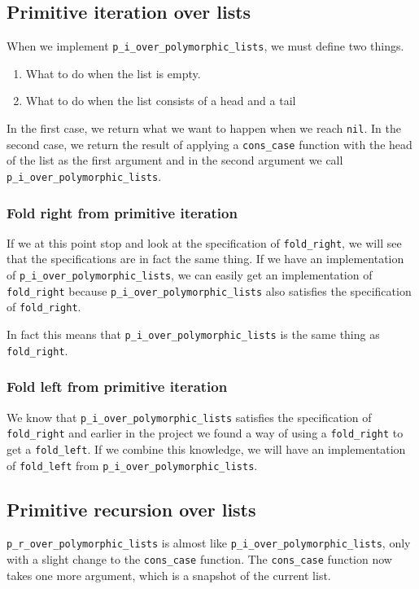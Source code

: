 \documentclass[a4paper]{article}
\begin{document}
\subsection{Primitive iteration over lists}
When we implement \texttt{p\_i\_over\_polymorphic\_lists}, we must define two
things.
\begin{enumerate}
  \item What to do when the list is empty.
  \item What to do when the list consists of a head and a tail
\end{enumerate}

In the first case, we return what we want to happen when we reach \texttt{nil}.
In the second case, we return the result of applying a \texttt{cons\_case}
function with the head of the list as the first argument and in the second
argument we call \texttt{p\_i\_over\_polymorphic\_lists}.

\subsubsection{Fold right from primitive iteration}
If we at this point stop and look at the specification of \texttt{fold\_right},
we will see that the specifications are in fact the same thing. If we have an
implementation of \texttt{p\_i\_over\_polymorphic\_lists}, we can easily get an
implementation of \texttt{fold\_right} because
\texttt{p\_i\_over\_polymorphic\_lists} also satisfies the specification of
\texttt{fold\_right}.

In fact this means that \texttt{p\_i\_over\_polymorphic\_lists} is the same thing as \texttt{fold\_right}.

\subsubsection{Fold left from primitive iteration} 
We know that \texttt{p\_i\_over\_polymorphic\_lists} satisfies the
specification of \linebreak\texttt{fold\_right} and earlier in the project we
found a way of using a \texttt{fold\_right} to get a \texttt{fold\_left}. If we
combine this knowledge, we will have an implementation of \texttt{fold\_left}
from \texttt{p\_i\_over\_polymorphic\_lists}.

\subsection{Primitive recursion over lists}
\texttt{p\_r\_over\_polymorphic\_lists} is almost like
\texttt{p\_i\_over\_polymorphic\_lists}, only with a slight change to the
\texttt{cons\_case} function. The \texttt{cons\_case} function now takes one
more argument, which is a snapshot of the current list.
\end{document}
